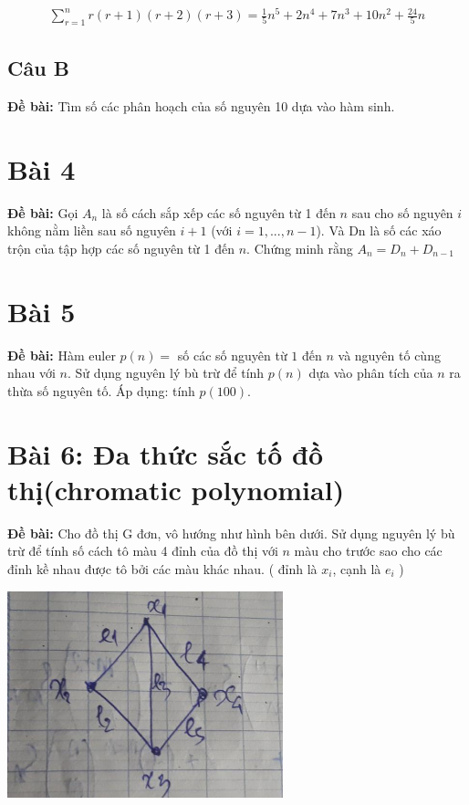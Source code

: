 \documentclass[12pt]{article}
\begin{document}
\begin{sloppypar}
\begin{align*}
    \sum_{r=1}^{n}r(r + 1)(r + 2)(r + 3) = \frac{1}{5}n^{5} + 2n^{4} + 7n^{3} + 10n^{2} + \frac{24}{5}n
\end{align*}



\subsection{Câu B}
\begin{tcolorbox}
    \textbf{Đề bài:} Tìm số các phân hoạch của số nguyên 10 dựa vào hàm sinh.
\end{tcolorbox}

\section{Bài 4}
\begin{tcolorbox}
    \textbf{Đề bài:}  Gọi \(A_{n}\) là số cách sắp xếp các số nguyên từ 1 đến \(n\) sau cho số nguyên \(i\) không nằm liền sau số nguyên \(i+1\) 
    (với \(i=1,...,n-1\)). Và Dn là số các xáo trộn của tập hợp các số nguyên từ 1 đến \(n\). Chứng minh rằng \(A_{n}= D_{n} + D_{n-1}\)
\end{tcolorbox}

\section{Bài 5}
\begin{tcolorbox}
    \textbf{Đề bài:} Hàm euler \(p(n)=\) số các số nguyên từ \(1\) đến \(n\) và nguyên tố cùng nhau với \(n\). Sử dụng nguyên lý bù trừ để tính \(p(n)\) dựa vào phân tích của \(n\) ra thừa số nguyên tố. Áp dụng: tính \(p(100)\).
\end{tcolorbox}

\section{Bài 6: Đa thức sắc tố đồ thị(chromatic polynomial)}
\begin{tcolorbox}
    \textbf{Đề bài:} Cho đồ thị G đơn, vô hướng như hình bên dưới.  Sử dụng nguyên lý bù trừ để tính số cách tô màu 4 đỉnh của đồ thị với  \(n\) màu cho trước sao cho các đỉnh kề nhau được tô bởi các màu khác nhau. ( đỉnh là \(x_{i}\), cạnh là \(e_{i}\) )
\end{tcolorbox}

\begin{center}
    {\includegraphics[width=8cm]{6.png}}
\end{center}


\end{sloppypar}
\end{document}
